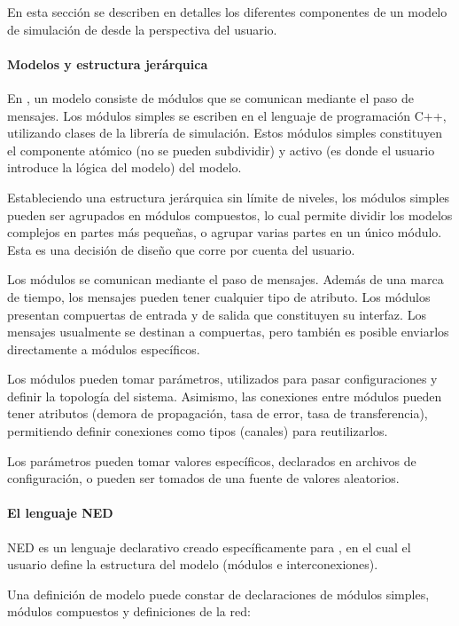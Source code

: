 En esta sección se describen en detalles los diferentes componentes de un
modelo de simulación de \omnetpp{} desde la perspectiva del usuario.

\paragraph{Modelos y estructura jerárquica}

En \omnetpp{}, un modelo consiste de módulos que se comunican mediante el paso de
mensajes. Los módulos simples se escriben en el lenguaje de programación C++,
utilizando clases de la librería de simulación. Estos módulos simples
constituyen el componente atómico (no se pueden subdividir) y activo (es donde
el usuario introduce la lógica del modelo) del modelo.

Estableciendo una estructura jerárquica sin límite de niveles, los módulos
simples pueden ser agrupados en módulos compuestos, lo cual permite dividir los
modelos complejos en partes más pequeñas, o agrupar varias partes en un único
módulo. Esta es una decisión de diseño que corre por cuenta del usuario. 

Los módulos se comunican mediante el paso de mensajes. Además de una marca de
tiempo, los mensajes pueden tener cualquier tipo de atributo. Los módulos
presentan compuertas de entrada y de salida que constituyen su interfaz.  Los
mensajes usualmente se destinan a compuertas, pero también es posible enviarlos
directamente a módulos específicos.

Los módulos pueden tomar parámetros, utilizados para pasar configuraciones y
definir la topología del sistema. Asimismo, las conexiones entre módulos pueden
tener atributos (demora de propagación, tasa de error, tasa de transferencia),
permitiendo definir conexiones como tipos (canales) para reutilizarlos.

Los parámetros pueden tomar valores específicos, declarados en archivos de
configuración, o pueden ser tomados de una fuente de valores aleatorios. 

\paragraph{El lenguaje NED}

NED es un lenguaje declarativo creado específicamente para \omnetpp{}, en el cual
el usuario define la estructura del modelo (módulos e interconexiones).

Una definición de modelo puede constar de declaraciones de módulos simples,
módulos compuestos y definiciones de la red:

